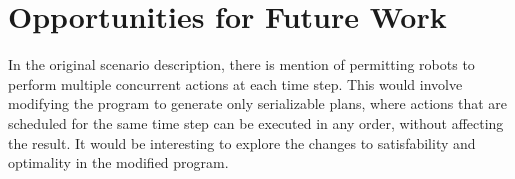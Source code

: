 \documentclass[letterpaper]{article}
\begin{document}
\section{Opportunities for Future Work}

In the original scenario description, there is mention of permitting robots to perform multiple concurrent actions at each time step. This would involve modifying the program to generate only serializable plans, where actions that are scheduled for the same time step can be executed in any order, without affecting the result. It would be interesting to explore the changes to satisfability and optimality in the modified program.

\nocite{found}
\nocite{recon}
\nocite{reform}
\nocite{glimpse}
\nocite{kaufmann2016grounding}
\nocite{Lifschitz2016AnswerSA}
\nocite{inproceedings}

\begin{quote}
    \begin{small}
        
        
    \end{small}
\end{quote}
\end{document}
